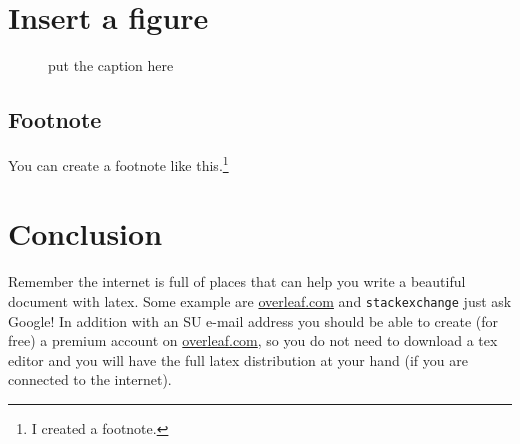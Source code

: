 \clearpage{\thispagestyle{empty}\cleardoublepage}

\section{Insert a figure}
\label{sec:insert-figure}
\begin{figure}[H]
\centering
\caption{\label{fig:insert-figure} put the caption here}
\end{figure}

\subsection{Footnote}
\label{ssec:footnote}

You can create a footnote like this.\footnote{I created a footnote.}



\clearpage{\thispagestyle{empty}\cleardoublepage}
\section{Conclusion}
\label{sec:conclusion}

Remember the internet is full of places that can help you write a beautiful document with latex.
Some example are \url{overleaf.com} and \verb!stackexchange! just ask Google! 
In addition with an SU e-mail address you should be able to 
create (for free) a premium account on \url{overleaf.com}, 
so you do not need to download a tex editor and you will have
the full latex distribution at your hand (if you are connected to the internet).

